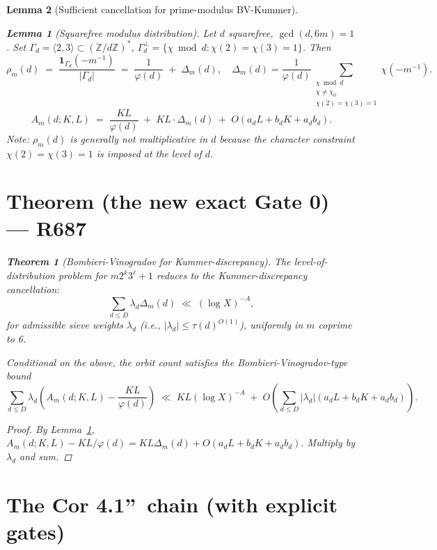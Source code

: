 \documentclass[12pt]{amsart}
\newtheorem{lemma}{Lemma}
\newtheorem{theorem}{Theorem}
\theoremstyle{definition}
\theoremstyle{remark}
\begin{document}
\begin{lemma}[Sufficient cancellation for prime-modulus BV-Kummer]
\begin{lemma}[Squarefree modulus distribution]\label{lem:R686}
Let $d$ squarefree, $\gcd(d, 6m) = 1$. Set $\Gamma_d = \langle 2, 3 \rangle \subset (\mathbb{Z}/d\mathbb{Z})^*$,
$\Gamma_d^\perp = \{\chi \bmod d : \chi(2) = \chi(3) = 1\}$. Then
$$
\rho_m(d)
\;=\;
\frac{\mathbf{1}_{\Gamma_d}(-m^{-1})}{|\Gamma_d|}
\;=\;
\frac{1}{\varphi(d)}
\;+\;
\Delta_m(d),
\quad
\Delta_m(d) = \frac{1}{\varphi(d)}
\sum_{\substack{\chi \bmod d \\ \chi \ne \chi_0 \\ \chi(2) = \chi(3) = 1}}
\chi(-m^{-1}).
$$
$$
A_m(d; K, L)
\;=\;
\frac{KL}{\varphi(d)}
\;+\;
KL \cdot \Delta_m(d)
\;+\;
O(a_d L + b_d K + a_d b_d).
$$
Note: $\rho_m(d)$ is generally not multiplicative in $d$ because the character constraint
$\chi(2) = \chi(3) = 1$ is imposed at the level of $d$.
\end{lemma}

\section{Theorem (the new exact Gate 0) --- R687}

\begin{theorem}[Bombieri-Vinogradov for Kummer-discrepancy]\label{thm:BV-Kummer}
The level-of-distribution problem for $m 2^k 3^\ell + 1$ reduces to the
Kummer-discrepancy cancellation:
$$
\sum_{d \le D} \lambda_d \Delta_m(d)
\;\ll\;
(\log X)^{-A},
$$
for admissible sieve weights $\lambda_d$ (i.e., $|\lambda_d| \le \tau(d)^{O(1)}$),
uniformly in $m$ coprime to 6.

Conditional on the above, the orbit count satisfies the Bombieri-Vinogradov-type bound
$$
\sum_{d \le D} \lambda_d \left( A_m(d; K, L) - \frac{KL}{\varphi(d)} \right)
\;\ll\;
KL (\log X)^{-A}
\;+\;
O\!\left( \sum_{d \le D} |\lambda_d| (a_d L + b_d K + a_d b_d) \right).
$$
\end{theorem}

\begin{proof}
By Lemma~\ref{lem:R686},
$A_m(d; K, L) - KL/\varphi(d) = KL \Delta_m(d) + O(a_d L + b_d K + a_d b_d)$. Multiply by $\lambda_d$ and sum.
\end{proof}

\section{The Cor 4.1\textquotedblright\ chain (with explicit gates)}


\end{lemma}
\end{document}
